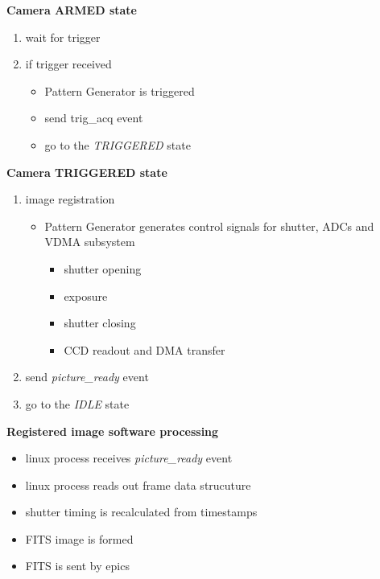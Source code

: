 \begin{description}
\begin{enumerate}
\end{enumerate}
\item \textbf{Camera ARMED state}
\begin{enumerate}
\item wait for trigger
\item if trigger received 
\begin{itemize}
\item Pattern Generator is triggered
\item send trig\_acq event
\item go to the \emph{TRIGGERED} state
\end{itemize}
\end{enumerate}
\item \textbf{Camera TRIGGERED state}
\begin{enumerate}
	\item image registration
	\begin{itemize}
	\item Pattern Generator generates control signals for shutter, ADCs and VDMA subsystem
		\begin{itemize}
			\item shutter opening
			\item exposure
			\item shutter closing
			\item CCD readout and DMA transfer
		\end{itemize}
	\end{itemize}
\item send \emph{picture\_ready} event
\item go to the \emph{IDLE} state
\end{enumerate}

\item \textbf{Registered image software processing}
\begin{itemize}
\item linux process receives \emph{picture\_ready} event
\item linux process reads out frame data strucuture
\item shutter timing is recalculated from timestamps
\item FITS image is formed
\item FITS is sent by epics
\end{itemize}

\end{description}
